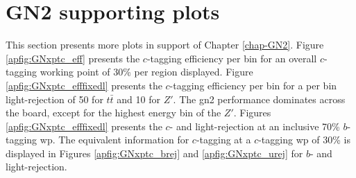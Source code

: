 \section{GN2 supporting plots}\label{app-GN2sup}
This section presents more plots in support of Chapter \ref{chap-GN2}. Figure \ref{apfig:GNxptc_eff} presents the $c$-tagging efficiency per bin for an overall $c$-tagging working point of 30\% per region displayed. Figure \ref{apfig:GNxptc_efffixedl} presents the $c$-tagging efficiency per bin for a per bin light-rejection of 50 for $t\bar{t}$ and 10 for $Z'$. The \gls{gn2} performance dominates across the board, except for the highest energy bin of the $Z'$. Figures \ref{apfig:GNxptc_efffixedl} presents the $c$- and light-rejection at an inclusive 70\% $b$-tagging \gls{wp}. The equivalent information for $c$-tagging at a $c$-tagging \gls{wp} of 30\% is displayed in Figures \ref{apfig:GNxptc_brej} and \ref{apfig:GNxptc_urej} for $b$- and light-rejection. 

